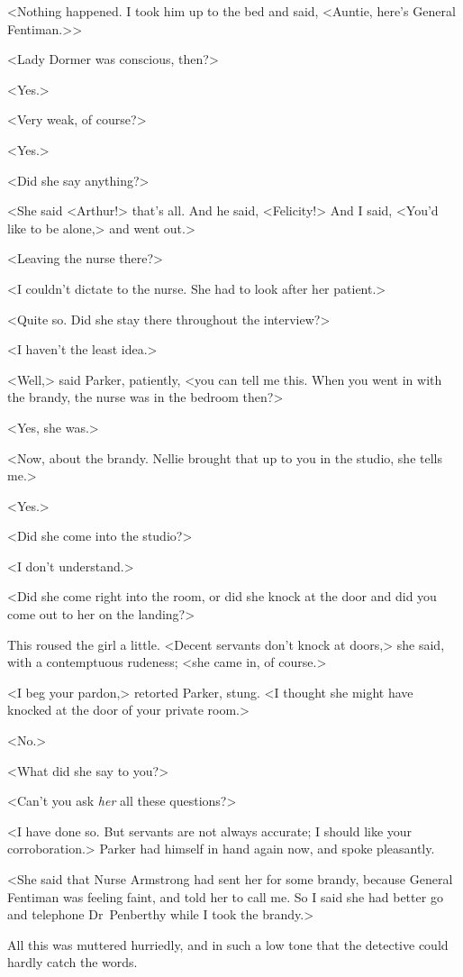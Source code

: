 <Nothing happened. I took him up to the bed and said, <Auntie, here's General Fentiman.>>

<Lady Dormer was conscious, then?>

<Yes.>

<Very weak, of course?>

<Yes.>

<Did she say anything?>

<She said <Arthur!> that's all. And he said, <Felicity!> And I said, <You'd like to be alone,> and went out.>

<Leaving the nurse there?>

<I couldn't dictate to the nurse. She had to look after her patient.>

<Quite so. Did she stay there throughout the interview?>

<I haven't the least idea.>

<Well,> said Parker, patiently, <you can tell me this. When you went in with the brandy, the nurse was in the bedroom then?>

<Yes, she was.>

<Now, about the brandy. Nellie brought that up to you in the studio, she tells me.>

<Yes.>

<Did she come into the studio?>

<I don't understand.>

<Did she come right into the room, or did she knock at the door and did you come out to her on the landing?>

This roused the girl a little. <Decent servants don't knock at doors,> she said, with a contemptuous rudeness; <she came in, of course.>

<I beg your pardon,> retorted Parker, stung. <I thought she might have knocked at the door of your private room.>

<No.>

<What did she say to you?>

<Can't you ask \emph{her} all these questions?>

<I have done so. But servants are not always accurate; I should like your corroboration.> Parker had himself in hand again now, and spoke pleasantly.

<She said that Nurse Armstrong had sent her for some brandy, because General Fentiman was feeling faint, and told her to call me. So I said she had better go and telephone Dr~Penberthy while I took the brandy.>

All this was muttered hurriedly, and in such a low tone that the detective could hardly catch the words.

